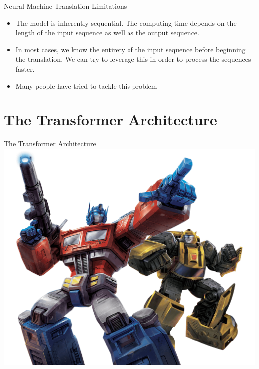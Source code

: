 \documentclass[aspectratio=169]{beamer}
\begin{document}
\begin{frame}{Neural Machine Translation}
\centering Limitations
\vspace{.5cm}

\raggedright
\begin{itemize}
	\item The model is inherently sequential. The computing time depends on the length of the input sequence as well as the output sequence.
	\item In most cases, we know the entirety of the input sequence before beginning the translation. We can try to leverage this in order to process the sequences faster.
	\item Many people have tried to tackle this problem \cite{gehring2017convolutional, kalchbrenner2016neural, gehring2016convolutional}
\end{itemize}
\end{frame}

\section{The Transformer Architecture}

\begin{frame}{The Transformer Architecture}
\includegraphics[width=\textwidth]{figures/optimus_prime_bumblebee}
\end{frame}
\end{document}
